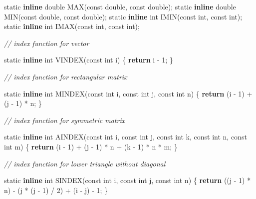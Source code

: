 \documentclass[12pt,]{article}
\newenvironment{Shaded}{\begin{snugshade}}{\end{snugshade}}
\newcommand{\CommentTok}[1]{\textcolor[rgb]{0.56,0.35,0.01}{\textit{#1}}}
\newcommand{\ControlFlowTok}[1]{\textcolor[rgb]{0.13,0.29,0.53}{\textbf{#1}}}
\newcommand{\DataTypeTok}[1]{\textcolor[rgb]{0.13,0.29,0.53}{#1}}
\newcommand{\DecValTok}[1]{\textcolor[rgb]{0.00,0.00,0.81}{#1}}
\newcommand{\KeywordTok}[1]{\textcolor[rgb]{0.13,0.29,0.53}{\textbf{#1}}}
\newcommand{\NormalTok}[1]{#1}
\begin{document}
\begin{Shaded}
\begin{Highlighting}[]
\DataTypeTok{static} \KeywordTok{inline} \DataTypeTok{double}\NormalTok{ MAX(}\DataTypeTok{const} \DataTypeTok{double}\NormalTok{, }\DataTypeTok{const} \DataTypeTok{double}\NormalTok{);}
\DataTypeTok{static} \KeywordTok{inline} \DataTypeTok{double}\NormalTok{ MIN(}\DataTypeTok{const} \DataTypeTok{double}\NormalTok{, }\DataTypeTok{const} \DataTypeTok{double}\NormalTok{);}
\DataTypeTok{static} \KeywordTok{inline} \DataTypeTok{int}\NormalTok{ IMIN(}\DataTypeTok{const} \DataTypeTok{int}\NormalTok{, }\DataTypeTok{const} \DataTypeTok{int}\NormalTok{);}
\DataTypeTok{static} \KeywordTok{inline} \DataTypeTok{int}\NormalTok{ IMAX(}\DataTypeTok{const} \DataTypeTok{int}\NormalTok{, }\DataTypeTok{const} \DataTypeTok{int}\NormalTok{);}

\CommentTok{// index function for vector  }

\DataTypeTok{static} \KeywordTok{inline} \DataTypeTok{int}\NormalTok{ VINDEX(}\DataTypeTok{const} \DataTypeTok{int}\NormalTok{ i) \{ }\ControlFlowTok{return}\NormalTok{ i - }\DecValTok{1}\NormalTok{; \}}

\CommentTok{// index function for rectangular matrix }

\DataTypeTok{static} \KeywordTok{inline} \DataTypeTok{int}\NormalTok{ MINDEX(}\DataTypeTok{const} \DataTypeTok{int}\NormalTok{ i, }\DataTypeTok{const} \DataTypeTok{int}\NormalTok{ j, }\DataTypeTok{const} \DataTypeTok{int}\NormalTok{ n) \{}
  \ControlFlowTok{return}\NormalTok{ (i - }\DecValTok{1}\NormalTok{) + (j - }\DecValTok{1}\NormalTok{) * n;}
\NormalTok{\}}

\CommentTok{// index function for symmetric matrix }

\DataTypeTok{static} \KeywordTok{inline} \DataTypeTok{int}\NormalTok{ AINDEX(}\DataTypeTok{const} \DataTypeTok{int}\NormalTok{ i, }\DataTypeTok{const} \DataTypeTok{int}\NormalTok{ j, }\DataTypeTok{const} \DataTypeTok{int}\NormalTok{ k, }\DataTypeTok{const} \DataTypeTok{int}\NormalTok{ n,}
                         \DataTypeTok{const} \DataTypeTok{int}\NormalTok{ m) \{}
  \ControlFlowTok{return}\NormalTok{ (i - }\DecValTok{1}\NormalTok{) + (j - }\DecValTok{1}\NormalTok{) * n + (k - }\DecValTok{1}\NormalTok{) * n * m;}
\NormalTok{\}}

\CommentTok{// index function for lower triangle without diagonal}

\DataTypeTok{static} \KeywordTok{inline} \DataTypeTok{int}\NormalTok{ SINDEX(}\DataTypeTok{const} \DataTypeTok{int}\NormalTok{ i, }\DataTypeTok{const} \DataTypeTok{int}\NormalTok{ j, }\DataTypeTok{const} \DataTypeTok{int}\NormalTok{ n) \{}
  \ControlFlowTok{return}\NormalTok{ ((j - }\DecValTok{1}\NormalTok{) * n) - (j * (j - }\DecValTok{1}\NormalTok{) / }\DecValTok{2}\NormalTok{) + (i - j) - }\DecValTok{1}\NormalTok{;}
\NormalTok{\}}


\end{Highlighting}
\end{Shaded}
\end{document}
